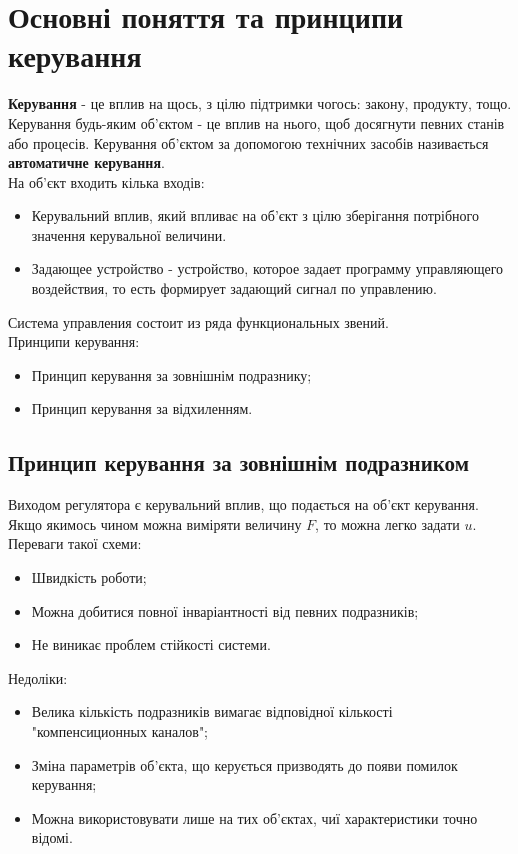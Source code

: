 \newcommand{\cdncdn}[2]{\cfrac{\dif^n #1}{\dif #2^n}}
\newcommand{\cdmcdm}[2]{\cfrac{\dif^m #1}{\dif #2^m}}
\section{Основні поняття та принципи керування}
{\bf Керування} - це вплив на щось, з цілю підтримки чогось: закону, продукту, тощо. \\
Керування будь-яким об’єктом - це вплив на нього, щоб досягнути певних станів або процесів. Керування об’єктом за допомогою технічних засобів називається {\bf автоматичне керування}. \\
На об’єкт входить кілька входів:\\
\begin{itemize}
\item Керувальний вплив, який впливає на об’єкт з цілю зберігання потрібного значення керувальної величини.
\item Задающее устройство - устройство, которое задает программу управляющего воздействия, то есть формирует задающий сигнал по управлению.
\end{itemize}
Система управления состоит из ряда функциональных звений. \\
%
Принципи керування:\\
\begin{itemize}
\item Принцип керування за зовнішнім подразнику;
\item Принцип керування за відхиленням.
\end{itemize}
\subsection{Принцип керування за зовнішнім подразником}
Виходом регулятора є керувальний вплив, що подається на об’єкт керування. \\
Якщо якимось чином можна виміряти величину $F$, то можна легко задати $u$. \\
Переваги такої схеми: 
\begin{itemize}
\item Швидкість роботи;
\item Можна добитися повної інваріантності від певних подразників;
\item Не виникає проблем стійкості системи.
\end{itemize}
Недоліки:
\begin{itemize}
\item Велика кількість подразників вимагає відповідної кількості "компенсиционных каналов";
\item Зміна параметрів об’єкта, що керується призводять до появи помилок керування;
\item Можна використовувати лише на тих об’єктах, чиї характеристики точно відомі.
\end{itemize}
